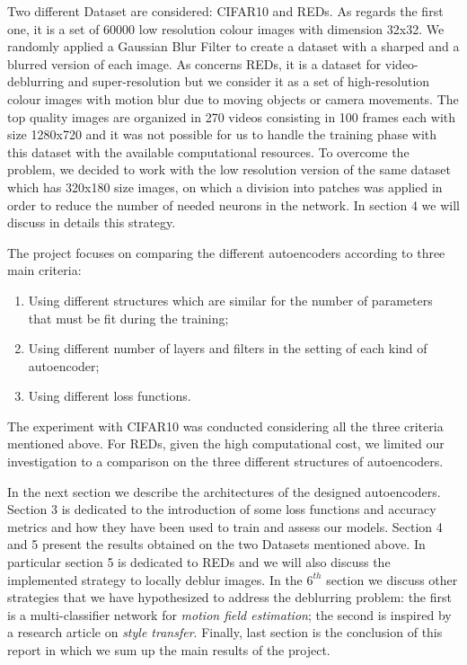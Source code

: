 \documentclass[12pt,a4paper]{article}
\begin{document}
Two different Dataset are considered: CIFAR10 and REDs. As regards the first one, it is a set of 60000 low resolution colour images with dimension 32x32. We randomly applied a Gaussian Blur Filter to create a dataset with a sharped and a blurred version of each image. As concerns REDs, it is a dataset for video-deblurring and super-resolution but we consider it as a set of high-resolution colour images with motion blur due to moving objects or camera movements. The top quality images are organized in 270 videos consisting in 100 frames each with size 1280x720 and it was not possible for us to handle the training phase with this dataset with the available computational resources. To overcome the problem, we decided to work with the low resolution version of the same dataset which has 320x180 size images, on which a division into patches was applied in order to reduce the number of needed neurons in the network. In section 4 we will discuss in details this strategy.

The project focuses on comparing the different autoencoders according to three main criteria:
\begin{enumerate}
\item Using different structures which are similar for the number of parameters that must be fit during the training;
\item Using different number of layers and filters in the setting of each kind of autoencoder;
\item Using different loss functions.
\end{enumerate}

The experiment with CIFAR10 was conducted considering all the three criteria mentioned above. For REDs, given the high computational cost, we limited our investigation to a comparison on the three different structures of autoencoders.

In the next section we describe the architectures of the designed autoencoders. Section 3 is dedicated to the introduction of some loss functions and accuracy metrics and how they have been used to train and assess our models. Section 4 and 5 present the results obtained on the two Datasets mentioned above. In particular section 5 is dedicated to REDs and we will also discuss the implemented strategy to locally deblur images. In the $6^{th}$ section we discuss other strategies that we have hypothesized to address the deblurring problem: the first is a multi-classifier network for \textit{motion field estimation}; the second is inspired by a research article\cite{G&E&B} on \textit{style transfer}. Finally, last section is the conclusion of this report in which we sum up the main results of the project.
 
\end{document}
